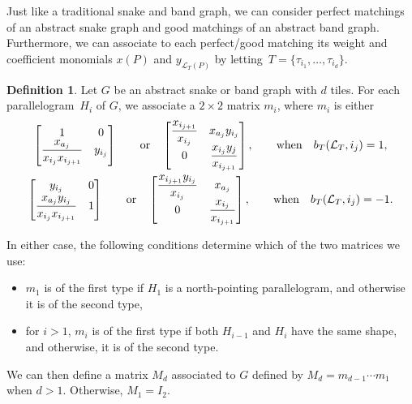 \documentclass[10pt,a4paper]{amsart}
\numberwithin{equation}{section}
\theoremstyle{definition}
\newtheorem{Definition}[Theorem]{Definition}
\begin{document}
Just like a traditional snake and band graph, we can consider perfect matchings of an abstract snake graph and good matchings of an abstract band graph. Furthermore, we can associate to each perfect/good matching its weight and coefficient monomials $x(P)$ and $y_{\mathcal{L}_{T}(P)}$ by letting~${T=\{\tau_{i_1},\ldots,\tau_{i_d}\}}$.

\begin{Definition}\label{definition:tilematrix}
Let $G$ be an abstract snake or band graph with $d$ tiles. For each parallelogram~$H_i$ of $G$, we associate a $2\times 2$ matrix $m_i$, where $m_i$ is either
\begin{gather*}
\begin{bmatrix}
1 & 0\\
\dfrac{x_{a_j}}{x_{i_j}x_{i_{j+1}}} & y_{i_j}
\end{bmatrix}\qquad\text{or}\quad
\begin{bmatrix}
\dfrac{x_{i_{j+1}}}{x_{i_j}} & x_{a_j}y_{i_j}\\
0 & \dfrac{x_{i_j}y_j}{x_{i_{j+1}}}
\end{bmatrix},\qquad\text{when}\quad b_{T}(\mathcal{L}_{T}, i_j)=1,
\\
\begin{bmatrix}
y_{i_j} & 0\vspace{1mm}\\
\dfrac{x_{a_j}y_{i_j}}{x_{i_j}x_{i_{j+1}}} & 1
\end{bmatrix}\qquad\text{or}\quad
\begin{bmatrix}
\dfrac{x_{i_{j+1}}y_{i_j}}{x_{i_j}} & x_{a_j}\\
0 & \dfrac{x_{i_j}}{x_{i_{j+1}}}
\end{bmatrix},\qquad\text{when}\quad b_{T}(\mathcal{L}_{T}, i_j)=-1.
\end{gather*}

In either case, the following conditions determine which of the two matrices we use:
\begin{itemize}\itemsep=0pt
\item $m_1$ is of the first type if $H_1$ is a north-pointing parallelogram, and otherwise it is of the second type,
\item for $i>1$, $m_i$ is of the first type if both $H_{i-1}$ and $H_i$ have the same shape, and otherwise, it is of the second type.
\end{itemize}
We can then define a matrix $M_d$ associated to $G$ defined by $M_d=m_{d-1}\cdots m_1$ when $d>1$. Otherwise, $M_1=I_2$.
\end{Definition}
\end{document}

